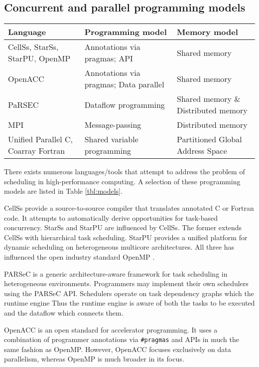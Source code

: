 \documentclass[preprint,10pt,numbers]{sigplanconf}
\begin{document}
  \subsection{Concurrent and parallel programming models}
\begin{table*}
\centering
\begin{tabular}{| l | l | l |}
\hline
 \textbf{Language}             & \textbf{Programming model} & \textbf{Memory model}\\
\hline
CellSs, StarSs, StarPU, OpenMP & Annotations via pragmas; API & Shared memory \\
\hline
OpenACC                        & Annotations via pragmas; Data parallel & Shared memory \\
\hline
PaRSEC                         & Dataflow programming & Shared memory \& Distributed memory  \\
\hline
MPI & Message-passing          & Distributed memory  \\
\hline
Unified Parallel C, Coarray Fortran & Shared variable programming & Partitioned Global Address Space \\
\hline
\end{tabular}
\caption{Classification of a selection of concurrent and parallel programming models.}\label{tbl:models}
\end{table*}
There exists numerous languages/tools that attempt to address the problem of scheduling in high-performance computing. A selection of these programming models are listed in Table \ref{tbl:models}.

CellSs \cite{Bellens2009} provide a source-to-source compiler that translates annotated C or Fortran code. It attempts to automatically derive opportunities for task-based concurrency. StarSs \cite{Planas2009} and StarPU \cite{Augonnet2011} are influenced by CellSs. The former extends CellSs with hierarchical task scheduling. StarPU provides a unified platform for dynamic scheduling on heterogeneous multicore architectures. All three has influenced the open industry standard OpenMP \cite{Openmp2013}. 

PARSeC \cite{Bosilca2013} is a generic architecture-aware framework for task scheduling in heterogeneous environments. Programmers may implement their own schedulers using the PARSeC API. Schedulers operate on task dependency graphs which the runtime engine
Thus the runtime engine is aware of both the tasks to be executed and the dataflow which connects them.

OpenACC \cite{Openacc2013} is an open standard for accelerator programming. It uses a combination of programmer annotations via \texttt{\#pragmas} and APIs in much the same fashion as OpenMP. However, OpenACC focuses exclusively on data parallelism, whereas OpenMP is much broader in its focus.
\end{document}
